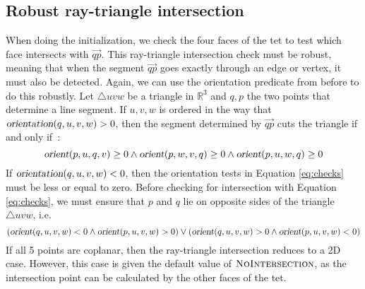 \documentclass[../thesis.tex]{subfiles}
\begin{document}
\subsection{Robust ray-triangle intersection}
When doing the initialization, we check the four faces of the tet to test which face
intersects with $\Vec{qp}$. This ray-triangle intersection check must be robust, 
meaning that when the segment $\Vec{qp}$ goes exactly through an edge or vertex, it must also be detected.
Again, we can use the orientation predicate from before to do this robustly.
Let $\triangle uvw$ be a triangle in $\mathbb{R}^3$ and $q,p$ the two points
that determine a line segment. If $u,v,w$ is ordered in the way
that $\textsl{orientation}(q,u,v,w) > 0$, then the segment determined by $\Vec{qp}$
cuts the triangle if and only if~\cite{segura}:
\begin{equation}\label{eq:checks}
  \op{orient}(p,u,q,v) \ge 0 \land \op{orient}(p,w,v,q) \ge 0 \land \op{orient}(p,u,w,q) \ge 0 
\end{equation}
If $\textsl{orientation}(q,u,v,w) < 0$, then the orientation tests in Equation \ref{eq:checks}
must be less or equal to zero.
Before checking for intersection with Equation \ref{eq:checks}, we must ensure that 
$p$ and $q$ lie on opposite sides of the triangle $\triangle uvw$, i.e.
\begin{equation}\label{eq:sides}
  (\op{orient}(q,u,v,w) < 0 \land \op{orient}(p,u,v,w) > 0)  \lor (\op{orient}(q,u,v,w) > 0 \land \op{orient}(p,u,v,w) < 0)  
\end{equation}
If all 5 points are coplanar, then the ray-triangle intersection reduces to a 2D case.
However, this case is given the default value of $\textsc{NoIntersection}$, as the
intersection point can be calculated by the other faces of the tet. 
\end{document}
